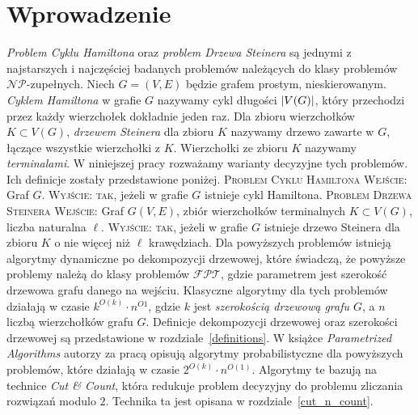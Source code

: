 \documentclass[12pt, oneside]{report}
\newcommand\Omicron{O}
\begin{document}
  	\chapter{Wprowadzenie}
	\emph{Problem Cyklu Hamiltona} oraz \emph{problem Drzewa Steinera} są jednymi z najstarszych i najczęściej badanych problemów należących do klasy problemów $\mathcal{NP}$-zupełnych. Niech $G=(V, E)$ będzie grafem prostym, nieskierowanym. \emph{Cyklem Hamiltona} w grafie $G$ nazywamy cykl długości $\abs{V(G)}$, który przechodzi przez każdy wierzchołek dokładnie jeden raz. Dla zbioru wierzchołków $K \subset V(G)$, \emph{drzewem Steinera} dla zbioru $K$ nazywamy drzewo zawarte w $G$, łączące wszystkie wierzchołki z $K$. Wierzchołki ze zbioru $K$ nazywamy \emph{terminalami}.  
	W niniejszej pracy rozważamy warianty decyzyjne tych problemów. Ich definicje zostały przedstawione poniżej. 
\newline\newline
\textsc{Problem Cyklu Hamiltona}
\newline
\textsc{ Wejście:} Graf $G$.
\newline
\textsc{ Wyjście:} \textsc{tak}, jeżeli w grafie $G$ istnieje cykl Hamiltona.
\newline\newline
\textsc{Problem Drzewa Steinera}
\newline
\textsc{ Wejście:} Graf $G(V,E)$, zbiór wierzchołków terminalnych $K \subset V(G)$, liczba naturalna $\ell$.
\newline
\textsc{ Wyjście:} \textsc{tak}, jeżeli w grafie $G$ istnieje drzewo Steinera dla zbioru $K$ o nie więcej niż $\ell$ krawędziach.
\newline\newline
Dla powyższych problemów istnieją algorytmy dynamiczne po dekompozycji drzewowej, które świadczą, że powyższe problemy należą do klasy problemów $\mathcal{FPT}$, gdzie parametrem jest szerokość drzewowa grafu danego na wejściu. Klasyczne algorytmy dla tych problemów działają w czasie $k^{\Omicron(k)} \cdot n^{\Omicron{1}}$, gdzie $k$ jest \emph{szerokością drzewową grafu $G$}, a $n$ liczbą wierzchołków grafu $G$. Definicje dekompozycji drzewowej oraz szerokości drzewowej są przedstawione w rozdziale~\ref{definitions}. W książce \emph{Parametrized Algorithms} \cite{parametrized_algorithms} autorzy za pracą \cite{solving_connectivity_problems} opisują algorytmy probabilistyczne dla powyższych problemów, które działają w czasie $2^{\Omicron(k)} \cdot n^{\Omicron{(1)}}$. Algorytmy te bazują na technice \emph{Cut \& Count}, która redukuje problem decyzyjny do problemu zliczania rozwiązań modulo $2$. Technika ta jest opisana w rozdziale~\ref{cut_n_count}.
\end{document}

